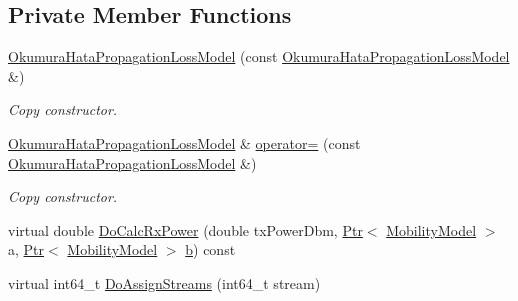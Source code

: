 \subsection*{Private Member Functions}
\begin{DoxyCompactItemize}
\item 
\hyperlink{classns3_1_1OkumuraHataPropagationLossModel_aed3bb279952072363a94667ed3e9e1c8}{Okumura\+Hata\+Propagation\+Loss\+Model} (const \hyperlink{classns3_1_1OkumuraHataPropagationLossModel}{Okumura\+Hata\+Propagation\+Loss\+Model} \&)
\begin{DoxyCompactList}\small\item\em Copy constructor. \end{DoxyCompactList}\item 
\hyperlink{classns3_1_1OkumuraHataPropagationLossModel}{Okumura\+Hata\+Propagation\+Loss\+Model} \& \hyperlink{classns3_1_1OkumuraHataPropagationLossModel_aec8b4b2ecc5efa4814ae6db5e364f7ac}{operator=} (const \hyperlink{classns3_1_1OkumuraHataPropagationLossModel}{Okumura\+Hata\+Propagation\+Loss\+Model} \&)
\begin{DoxyCompactList}\small\item\em Copy constructor. \end{DoxyCompactList}\item 
virtual double \hyperlink{classns3_1_1OkumuraHataPropagationLossModel_ab3a4458fc050a0e246e21eae2ca1e955}{Do\+Calc\+Rx\+Power} (double tx\+Power\+Dbm, \hyperlink{classns3_1_1Ptr}{Ptr}$<$ \hyperlink{classns3_1_1MobilityModel}{Mobility\+Model} $>$ a, \hyperlink{classns3_1_1Ptr}{Ptr}$<$ \hyperlink{classns3_1_1MobilityModel}{Mobility\+Model} $>$ \hyperlink{lte__pathloss_8m_a21ad0bd836b90d08f4cf640b4c298e7c}{b}) const 
\item 
virtual int64\+\_\+t \hyperlink{classns3_1_1OkumuraHataPropagationLossModel_ab5b88de97c3b463ef6785ff901f1b59f}{Do\+Assign\+Streams} (int64\+\_\+t stream)
\end{DoxyCompactItemize}
